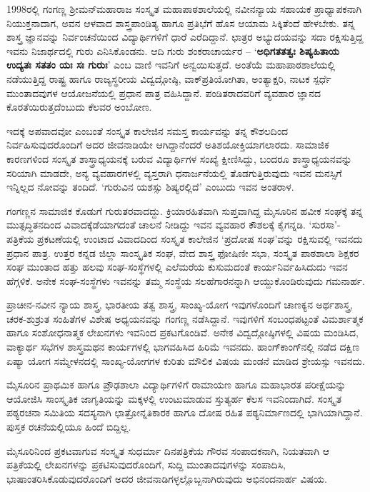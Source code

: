 1998ರಲ್ಲಿ ಗಂಗಣ್ಣ ಶ್ರೀಮನ್‍ಮಹಾರಾಜ ಸಂಸ್ಕೃತ ಮಹಾಪಾಠಶಾಲೆಯಲ್ಲಿ ನವೀನನ್ಯಾಯ ಸಹಾಯಕ ಪ್ರಾಧ್ಯಾಪಕನಾಗಿ ನಿಯುಕ್ತನಾದಾಗ, ಅವನ ಆಳವಾದ ಶಾಸ್ತ್ರಪಾಂಡಿತ್ಯ ಹಾಗೂ ಪ್ರತಿಭೆಗೆ ಹೊಸ ಆಯಾಮ ಸಿಕ್ಕಿತೆಂದೆ ಹೇಳಬೇಕು. ತನ್ನ ಶಾಸ್ತ್ರ ಜ್ಞಾನವನ್ನು ನಿರ್ವಂಚನೆಯಿಂದ ವಿದ್ಯಾರ್ಥಿಗಳಿಗೆ ಧಾರೆ ಎರೆದಿದ್ದಾನೆ. ಛಾತ್ರರ ಅಭ್ಯುದಯವನ್ನು ಸದಾ ರಕ್ಷಿಸುತ್ತಿದ್ದ  ಇವನು ನಿಜಾರ್ಥದಲ್ಲಿ ಗುರು ಎನಿಸಿಕೊಂಡನು. ಆದಿ ಗುರು ಶಂಕರಾಚಾರ್ಯರ – ‘\textbf{ಅಧಿಗತತತ್ವಃ ಶಿಷ್ಯಹಿತಾಯ ಉದ್ಯತಃ ಸತತಂ ಯಃ ಸಃ ಗುರುಃ}’ ಎಂಬ ವಾಣಿ ಇವನಿಗೆ ಅನ್ವಯಿಸುತ್ತದೆ. ಅಂತೆಯೆ ಮಹಾಪಾಠಶಾಲೆಯಲ್ಲಿ ನಡೆಯುತ್ತಿದ್ದ ರಾಷ್ಟ್ರ ಹಾಗೂ ರಾಜ್ಯಸ್ಥರೀಯ ವಿದ್ವದ್ಗೋಷ್ಠಿ, ವಾಕ್‍ಪ್ರತಿಯೋಗಿತಾ, ಅಂತ್ಯಾಕ್ಷರಿ, ನಾಟಕ ಸ್ಪರ್ಧೆ ಮುಂತಾದವುಗಳ ಆಯೋಜನೆಯಲ್ಲಿ ಪ್ರಧಾನ ಪಾತ್ರ ವಹಿಸಿದ್ದಾನೆ. ಪಂಡಿತರಾದವರಿಗೆ ವ್ಯವಹಾರ ಜ್ಞಾನದ ಕೊರತೆಯಿರುತ್ತದೆಂಬುದು ಕೆಲವರ ಅಂಬೋಣ. 

ಇದಕ್ಕೆ ಅಪವಾದವೋ ಎಂಬಂತೆ ಸಂಸ್ಕೃತ ಕಾಲೇಜಿನ ಸಮಸ್ತ ಕಾರ್ಯವನ್ನು ತನ್ನ ಕೌಶಲದಿಂದ ನಿರ್ವಹಿಸುವುದರೊಂದಿಗೆ ಅದರ ಜೀವನಾಡಿಯೇ ಆಗಿದ್ದಾನೆಂದರೆ ಅತಿಶಯೋಕ್ತಿಯಾಗಲಾರದು. ಸಾಮಾಜಿಕ ಕಾರಣಗಳಿಂದ ಸಂಸ್ಕೃತ ಶಾಸ್ತ್ರಾಧ್ಯಯನಕ್ಕೆ ಬರುವ ವಿದ್ಯಾರ್ಥಿಗಳ ಸಂಖ್ಯೆ ಕ್ಷೀಣಿಸಿದ್ದು, ಬಂದರೂ ಶಾಸ್ತ್ರಾಧ್ಯಯನವನ್ನು ಸರಿಯಾಗಿ ಮಾಡದೇ, ಅನ್ಯ ವ್ಯವಹಾರಗಳಲ್ಲಿ ವ್ಯಸ್ತರಾಗಿ ಧನಾರ್ಜನೆಯಲ್ಲಿ ತೊಡಗುತ್ತಿರುವುದು ಇವನ ಮನಸ್ಸಿಗೆ ಇನ್ನಿಲ್ಲದ ನೋವನ್ನು ತಂದಿದೆ. ‘ಗುರುವಿನ ಯಶಸ್ಸು ಶಿಷ್ಯರಲ್ಲಿದೆ’ ಎಂಬುದು ಇವನ ಅಂತರಾಳ.

ಗಂಗಣ್ಣನ ಸಾಮಾಜಿಕ ಕೊಡುಗೆ ಗುರುತರವಾದದ್ದು. ಕ್ರಿಯಾರಹಿತವಾಗಿ ಸುಪ್ತವಾಗಿದ್ದ ಮೈಸೂರಿನ ಹವೀಕ ಸಂಘಕ್ಕೆ ತನ್ನ ಮುತ್ಸದ್ಧಿತನದಿಂದ ವಿವಾದಕ್ಕೆಡೆಯಾಗದಂತೆ ಚಾಲನೆ ನೀಡಿದ್ದು ಇವನ ವ್ಯವಹಾರ ಕೌಶಲಕ್ಕೆ ಕೈಗನ್ನಡಿ. ‘ಸುರಸಾ’-ಪತ್ರಿಕೆಯ ಪ್ರಕಟಣೆಯಲ್ಲಿ ಉಂಟಾದ ವಿವಾದದಿಂದ ಸಂಸ್ಕೃತ ಕಾಲೇಜಿನ ‘ಪ್ರದೋಷ ಸಂಘ’ವನ್ನು ರಕ್ಷಿಸುವಲ್ಲಿ ಇವನದು ಪ್ರಧಾನ ಪಾತ್ರ. ಉತ್ತರ ಕನ್ನಡ ಜಿಲ್ಲಾ ಸಾಂಸ್ಕೃತಿಕ ಸಂಘ, ವೇದ ಶಾಸ್ತ್ರ  ಫೋಷಿಣೀ ಸಭಾ, ಸಂಸ್ಕೃತ ಪಾಠಶಾಲಾ ಶಿಕ್ಷಕರ ಸಂಘ ಮುಂತಾದ ಹತ್ತು ಹಲವು ಸಂಘ-ಸಂಸ್ಥೆಗಳಲ್ಲಿ ಎಲೆಮರೆಯ ಕುಸುಮದಂತೆ ಕಾರ್ಯನಿರ್ವಹಿಸಿದುದು ಇವನ ಹೆಗ್ಗಳಿಕೆ. ಅನೇಕ ಸಂಘ-ಸಂಸ್ಥೆಗಳು ಇವನನ್ನು ತಮ್ಮ ಸಂಸ್ಥೆಯ ಸಲಹೆಗಾರನನ್ನಾಗಿ ಆಯ್ದುಕೊಂಡಿರುವುದು ಗಮನಾರ್ಹ.

ಪ್ರಾಚೀನ-ನವೀನ ನ್ಯಾಯ ಶಾಸ್ತ್ರ, ಭಾರತೀಯ ತತ್ವ ಶಾಸ್ತ್ರ, ಸಾಂಖ್ಯ-ಯೋಗ ಇವುಗಳೊಂದಿಗೆ ಚಾಣಕ್ಯನ ಅರ್ಥಶಾಸ್ತ್ರ, ಚರಕ-ಶುಶ್ರುತ ಸಂಹಿತೆಗಳ ವಿಶೇಷ ಅಧ್ಯಯನವನ್ನು ಗಂಗಣ್ಣ ನಡೆಸಿದ್ದಾನೆ. ಇವುಗಳಿಗೆ ಸಂಬಂಧಪಟ್ಟಂತೆ ವಿಮರ್ಶಾತ್ಮಕ ಹಾಗೂ ಸಂಶೋಧನಾತ್ಮಕ ಲೇಖನಗಳು ಇವನಿಂದ ಪ್ರಕಟಗೊಂಡಿವೆ. ಅನೇಕ ವಿದ್ವದ್ಗೋಷ್ಠಿಗಳಲ್ಲಿ ವಿಷಯ ಮಂಡಿಸಿದ, ವಾಕ್ಯಾರ್ಥ ಸಭೆಗಳ ಶಾಸ್ತ್ರಮಥನ ಕಾರ್ಯಗಳಲ್ಲಿ ಭಾಗವಹಿಸಿದ ಹಿರಿಮೆ ಇವನದು. ಹಾಂಗ್‍ಕಾಂಗ್‍ನಲ್ಲಿ ನಡೆದ ದಕ್ಷಿಣ ಏಷ್ಯಾ ಯೋಗ ಸಮ್ಮೇಳನದಲ್ಲಿ ಸಾಂಖ್ಯ-ಯೋಗಗಳ ಕುರಿತು ಮೌಲಿಕ ವಿಷಯ ಮಂಡನೆ ಮಾಡಿದ ಶ್ರೇಯಸ್ಸು ಇವನದು. 

ಮೈಸೂರಿನ ಪ್ರಾಥಮಿಕ ಹಾಗೂ ಪ್ರೌಢಶಾಲಾ ವಿದ್ಯಾರ್ಥಿಗಳಿಗೆ ರಾಮಾಯಣ ಹಾಗೂ ಮಹಾಭಾರತ ಪರೀಕ್ಷೆಯನ್ನು ಆಯೋಜಿಸಿ ಸಾಂಸ್ಕೃತಿಕ ಜಾಗೃತಿಯನ್ನು ಮಕ್ಕಳಲ್ಲಿ ಉಂಟುಮಾಡುವ ಸ್ತುತ್ಯರ್ಹ ಕೆಲಸ ಇವನಿಂದಾಗಿದೆ. ಸಂಸ್ಕೃತ ಪಠ್ಯರಚನಾ ಸಮಿತಿಯ ಸದಸ್ಯನಾಗಿ ಛಾತ್ರೋನ್ನತಿಕಾರಕ ಹಾಗೂ ದೋಷ ರಹಿತ ಪಠ್ಯನಿರ್ಮಾಣದಲ್ಲಿ ಭಾಗಿಯಾಗಿದ್ದಾನೆ. ಪುಸ್ತಕ ರಚನೆಯಲ್ಲಿಯೂ ಹಿಂದೆ ಬಿದ್ದಿಲ್ಲ.

ಮೈಸೂರಿನಿಂದ ಪ್ರಕಟವಾಗುವ ಸಂಸ್ಕೃತ ಸುಧರ್ಮಾ ದಿನಪತ್ರಿಕೆಯ ಗೌರವ ಸಂಪಾದಕನಾಗಿ, ನಿಯತವಾಗಿ ಆ ಪತ್ರಿಕೆಯಲ್ಲಿ ಲೇಖನಗಳನ್ನು ಪ್ರಕಟಿಸುವುದರೊಂದಿಗೆ, ಸುದ್ದಿ ಮುಂತಾದವುಗಳನ್ನು ಸಂಪಾದಿಸಿ, ಭಾಷಾಂತರಿಸಿಕೊಡುವುದರೊಂದಿಗೆ ಅದರ ಜೀವನಾಡಿಗಳ್ಳಲ್ಲೊಬ್ಬನಾಗಿರುವುದು ಅಭಿನಂದನಾರ್ಹ ವಿಷಯ.


